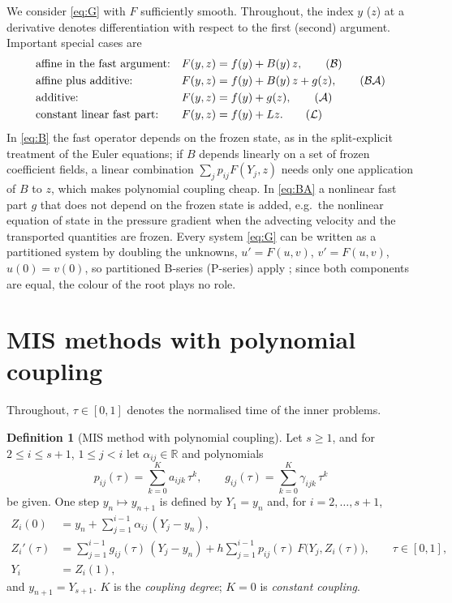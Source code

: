 \documentclass[11pt,a4paper]{article}
\theoremstyle{definition}
\newtheorem{definition}[theorem]{Definition}
\theoremstyle{remark}
\newcommand{\R}{\mathbb{R}}
\begin{document}
We consider \eqref{eq:G} with $F$ sufficiently smooth. Throughout, the index $y$ ($z$) at a derivative denotes
differentiation with respect to the first (second) argument. Important special cases are
\begin{align}
 &\text{affine in the fast argument:} && F(y,z)=f(y)+B(y)\,z, \tag{$\mathcal B$}\label{eq:B}\\
 &\text{affine plus additive:} && F(y,z)=f(y)+B(y)\,z+g(z), \tag{$\mathcal{BA}$}\label{eq:BA}\\
 &\text{additive:} && F(y,z)=f(y)+g(z), \tag{$\mathcal A$}\label{eq:A}\\
 &\text{constant linear fast part:} && F(y,z)=f(y)+Lz. \tag{$\mathcal L$}\label{eq:L}
\end{align}
In \eqref{eq:B} the fast operator depends on the frozen state, as in the split-explicit treatment of the Euler equations;
if $B$ depends linearly on a set of frozen coefficient fields, a linear combination $\sum_jp_{ij}F(Y_j,z)$ needs only one
application of $B$ to $z$, which makes polynomial coupling cheap. In \eqref{eq:BA} a nonlinear fast part $g$ that does
not depend on the frozen state is added, e.g.\ the nonlinear equation of state in the pressure gradient when the
advecting velocity and the transported quantities are frozen. Every system \eqref{eq:G} can be written as a
partitioned system by doubling the unknowns, $u'=F(u,v)$, $v'=F(u,v)$, $u(0)=v(0)$, so partitioned B-series (P-series)
apply \cite{HairerNorsettWanner1993}; since both components are equal, the colour of the root plays no role.

\section{MIS methods with polynomial coupling}
\label{sec:methods}

Throughout, $\tau\in[0,1]$ denotes the normalised time of the inner problems.

\begin{definition}[MIS method with polynomial coupling]\label{def:mis}
Let $s\ge1$, and for $2\le i\le s+1$, $1\le j<i$ let $\alpha_{ij}\in\R$ and polynomials
\[
 p_{ij}(\tau)=\sum_{k=0}^{K}a_{ijk}\,\tau^k,\qquad g_{ij}(\tau)=\sum_{k=0}^{K}\gamma_{ijk}\,\tau^k
\]
be given. One step $y_n\mapsto y_{n+1}$ is defined by $Y_1=y_n$ and, for $i=2,\dots,s+1$,
\begin{align}
 Z_i(0) &= y_n+\sum_{j=1}^{i-1}\alpha_{ij}\,(Y_j-y_n), \label{eq:mis1}\\
 Z_i'(\tau) &= \sum_{j=1}^{i-1}g_{ij}(\tau)\,(Y_j-y_n) + h\sum_{j=1}^{i-1}p_{ij}(\tau)\,F\big(Y_j,Z_i(\tau)\big),
   \qquad \tau\in[0,1], \label{eq:mis2}\\
 Y_i &= Z_i(1), \label{eq:mis3}
\end{align}
and $y_{n+1}=Y_{s+1}$. $K$ is the \emph{coupling degree}; $K=0$ is \emph{constant coupling}.
\end{definition}
\end{document}
